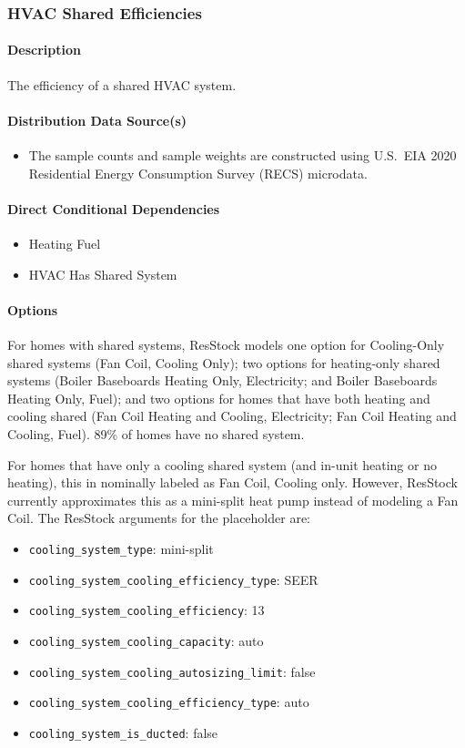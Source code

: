 \subsubsection{HVAC Shared Efficiencies}

\paragraph{Description}
The efficiency of a shared HVAC system.

\paragraph{Distribution Data Source(s)}
\begin{itemize}
    \item The sample counts and sample weights are constructed using U.S.~EIA 2020 Residential Energy Consumption Survey (RECS) microdata.
\end{itemize}

\paragraph{Direct Conditional Dependencies}
\begin{itemize}
    \item Heating Fuel
    \item HVAC Has Shared System
\end{itemize}
\paragraph{Options}
For homes with shared systems, ResStock models one option for Cooling-Only shared systems (Fan Coil, Cooling Only); two options for heating-only shared systems (Boiler Baseboards Heating Only, Electricity; and Boiler Baseboards Heating Only, Fuel); and two options for homes that have both heating and cooling shared (Fan Coil Heating and Cooling, Electricity; Fan Coil Heating and Cooling, Fuel). 89\% of homes have no shared system.  


For homes that have only a cooling shared system (and in-unit heating or no heating), this in nominally labeled as Fan Coil, Cooling only. However, ResStock currently approximates this as a mini-split heat pump instead of modeling a Fan Coil. The ResStock arguments for the placeholder are:
\begin{itemize}
    \item \texttt{cooling\_system\_type}: mini-split
    \item \texttt{cooling\_system\_cooling\_efficiency\_type}: SEER
    \item \texttt{cooling\_system\_cooling\_efficiency}: 13
    \item \texttt{cooling\_system\_cooling\_capacity}: auto
    \item \texttt{cooling\_system\_cooling\_autosizing\_limit}: false
    \item \texttt{cooling\_system\_cooling\_efficiency\_type}: auto
    \item \texttt{cooling\_system\_is\_ducted}: false
\end{itemize}


